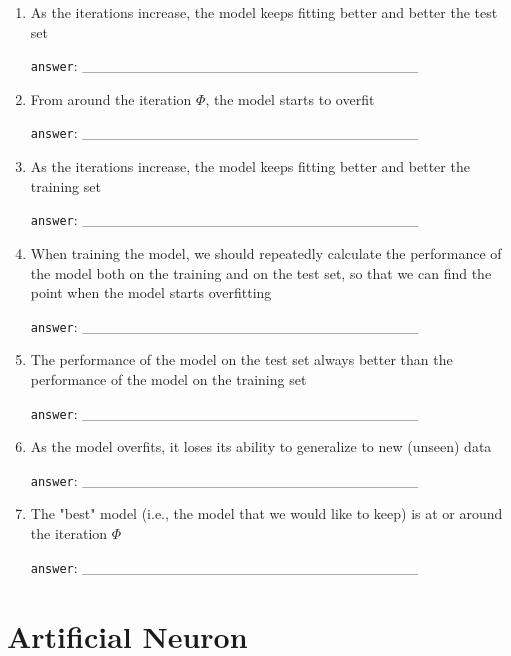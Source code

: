 \documentclass[a4paper,11pt]{scrartcl}
\begin{document}
\begin{enumerate}[label=\alph*)]
\singlespacing%

\item As the iterations increase, the model keeps fitting better and better
      the test set

\verb|answer|: \_\_\_\_\_\_\_\_\_\_\_\_\_\_\_\_\_\_\_\_\_\_\_\_\_\_\_\_\_\_\_\_

\item From around the iteration $\Phi$, the model starts to overfit 

\verb|answer|: \_\_\_\_\_\_\_\_\_\_\_\_\_\_\_\_\_\_\_\_\_\_\_\_\_\_\_\_\_\_\_\_

\item As the iterations increase, the model keeps fitting better and better
      the training set

\verb|answer|: \_\_\_\_\_\_\_\_\_\_\_\_\_\_\_\_\_\_\_\_\_\_\_\_\_\_\_\_\_\_\_\_

\item When training the model, we should repeatedly calculate the performance
      of the model both on the training and on the test set, so that we can
      find the point when the model starts overfitting

\verb|answer|: \_\_\_\_\_\_\_\_\_\_\_\_\_\_\_\_\_\_\_\_\_\_\_\_\_\_\_\_\_\_\_\_

\item The performance of the model on the test set always better than the
      performance of the model on the training set

\verb|answer|: \_\_\_\_\_\_\_\_\_\_\_\_\_\_\_\_\_\_\_\_\_\_\_\_\_\_\_\_\_\_\_\_

\item As the model overfits, it loses its ability to generalize to new
      (unseen) data

\verb|answer|: \_\_\_\_\_\_\_\_\_\_\_\_\_\_\_\_\_\_\_\_\_\_\_\_\_\_\_\_\_\_\_\_

\item The "best" model (i.e., the model that we would like to keep) is at or
      around the iteration $\Phi$

\verb|answer|: \_\_\_\_\_\_\_\_\_\_\_\_\_\_\_\_\_\_\_\_\_\_\_\_\_\_\_\_\_\_\_\_

\end{enumerate}


\section{Artificial Neuron}
\end{document}
